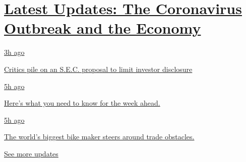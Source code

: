\hypertarget{latest-updates-the-coronavirus-outbreak-and-the-economy}{%
\section{\texorpdfstring{\href{https://www.nytimes.com/live/2020/08/17/business/stock-market-today-coronavirus?action=click\&pgtype=Article\&state=default\&region=MAIN_CONTENT_1\&context=storylines_live_updates}{Latest
Updates: The Coronavirus Outbreak and the
Economy}}{Latest Updates: The Coronavirus Outbreak and the Economy}}\label{latest-updates-the-coronavirus-outbreak-and-the-economy}}

\href{https://www.nytimes.com/live/2020/08/17/business/stock-market-today-coronavirus?action=click\&pgtype=Article\&state=default\&region=MAIN_CONTENT_1\&context=storylines_live_updates\#critics-pile-on-an-sec-proposal-to-limit-investor-disclosure}{3h
ago}

\href{https://www.nytimes.com/live/2020/08/17/business/stock-market-today-coronavirus?action=click\&pgtype=Article\&state=default\&region=MAIN_CONTENT_1\&context=storylines_live_updates\#critics-pile-on-an-sec-proposal-to-limit-investor-disclosure}{Critics
pile on an S.E.C. proposal to limit investor disclosure}

\href{https://www.nytimes.com/live/2020/08/17/business/stock-market-today-coronavirus?action=click\&pgtype=Article\&state=default\&region=MAIN_CONTENT_1\&context=storylines_live_updates\#heres-what-you-need-to-know-for-the-week-ahead}{5h
ago}

\href{https://www.nytimes.com/live/2020/08/17/business/stock-market-today-coronavirus?action=click\&pgtype=Article\&state=default\&region=MAIN_CONTENT_1\&context=storylines_live_updates\#heres-what-you-need-to-know-for-the-week-ahead}{Here's
what you need to know for the week ahead.}

\href{https://www.nytimes.com/live/2020/08/17/business/stock-market-today-coronavirus?action=click\&pgtype=Article\&state=default\&region=MAIN_CONTENT_1\&context=storylines_live_updates\#the-worlds-biggest-bike-maker-steers-around-trade-obstacles}{5h
ago}

\href{https://www.nytimes.com/live/2020/08/17/business/stock-market-today-coronavirus?action=click\&pgtype=Article\&state=default\&region=MAIN_CONTENT_1\&context=storylines_live_updates\#the-worlds-biggest-bike-maker-steers-around-trade-obstacles}{The
world's biggest bike maker steers around trade obstacles.}

\href{https://www.nytimes.com/live/2020/08/17/business/stock-market-today-coronavirus?action=click\&pgtype=Article\&state=default\&region=MAIN_CONTENT_1\&context=storylines_live_updates}{See
more updates}

